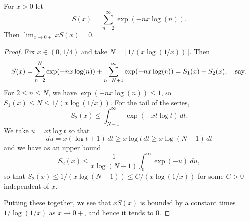 \documentclass[10pt,a4paper]{amsart}
\begin{document}
\begin{lem}\label{lem:xsx}
For $x>0$ let
\[
S(x)= \sum_{n=2}^\infty \exp(-nx\log(n)) .
\]
Then  $\lim_{x \to 0+} xS(x) =0$.
\end{lem}

\begin{proof}
Fix $x \in (0,1/4)$ and  take $N=\lfloor 1/(x \log (1/x)) \rfloor$.
Then
\[
S(x)= \sum_{n=2}^N \exp(-nx\log(n)) + \sum_{n=N+1}^\infty \exp(-nx\log(n))= S_1(x)+S_2(x), \quad \hbox{say}.
\]
For $2\le n\le N$, we have $\exp(-nx\log(n))\le 1$, so
$S_1 (x)\le N\le 1/(x \log (1/x))$. For the tail of the series,
\[
S_2(x) \le \int_{N-1}^\infty\exp(-xt\log t) \, dt.
\]
We take $u=xt \log t$ so that
\[
du=x(\log t+1)\,  dt \ge x \log t \, dt \ge x \log  (N-1) \, dt
\]
and we have as an upper bound
\[
S_2(x) \le \frac{1}{x \log (N - 1)}\int_{0}^\infty \exp(-u) \ du,
\]
so that $S_2(x) \le 1/(x \log (N-1)) \le C/(x \log (1/x))$ for some $C>0$ independent of $x$.

Putting these together, we see that $xS(x)$ is bounded by a constant times $1/\log(1/x)$ as $x \to 0+$, and hence
it tends to $0$.
\end{proof}
\end{document}
